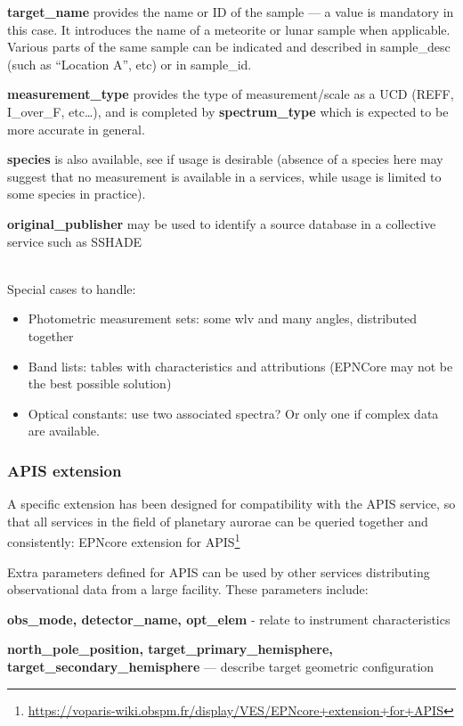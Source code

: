 \documentclass[11pt,a4paper]{ivoa}
\begin{document}
\textbf{target\_name }provides the name or ID of the sample — a value
is mandatory in this case. It introduces the name of a meteorite or
lunar sample when applicable. Various parts of the same sample can be
indicated and described in sample\_desc (such as ``Location A'', etc)
or in sample\_id.

\textbf{measurement\_type} provides the type of measurement/scale as a UCD
(REFF, I\_over\_F, etc…), and is completed by \textbf{spectrum\_type}
which is expected to be more accurate in general.

\textbf{species} is also available, see if usage is desirable (absence of
a species here may suggest that no measurement is available in a services,
while usage is limited to some species in practice).

\textbf{original\_publisher }may be used to identify a source database
in a collective service such as SSHADE


\textbf{\\}
Special cases to handle:

\begin{itemize}
\item Photometric measurement sets: some wlv and many angles,
distributed together
\item Band lists: tables with characteristics and attributions
(EPNCore may not be the best possible solution)
\item Optical constants: use two associated spectra?
Or only one if complex data are available.
\end{itemize}

\subsubsection{APIS extension}

A specific extension has been designed for compatibility with the
APIS service, so that all services in the field of planetary aurorae
can be queried together and consistently: EPNcore extension for
APIS\footnote{\url{https://voparis-wiki.obspm.fr/display/VES/EPNcore+extension+for+APIS}}

Extra parameters defined for APIS can be used by other services
distributing observational data from a large facility.
These parameters include:

\textbf{obs\_mode, detector\_name, opt\_elem }- relate to instrument
characteristics

\textbf{north\_pole\_position, target\_primary\_hemisphere,
target\_secondary\_hemisphere} --- describe target geometric configuration
\end{document}
